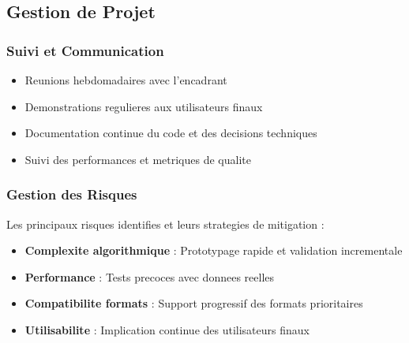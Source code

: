 \documentclass[12pt,a4paper]{article}
\begin{document}
\subsection{Gestion de Projet}

\subsubsection{Suivi et Communication}
\begin{itemize}
\item Reunions hebdomadaires avec l'encadrant
\item Demonstrations regulieres aux utilisateurs finaux
\item Documentation continue du code et des decisions techniques
\item Suivi des performances et metriques de qualite
\end{itemize}

\subsubsection{Gestion des Risques}
Les principaux risques identifies et leurs strategies de mitigation :

\begin{itemize}
\item \textbf{Complexite algorithmique} : Prototypage rapide et validation incrementale
\item \textbf{Performance} : Tests precoces avec donnees reelles
\item \textbf{Compatibilite formats} : Support progressif des formats prioritaires
\item \textbf{Utilisabilite} : Implication continue des utilisateurs finaux
\end{itemize}
\end{document}

